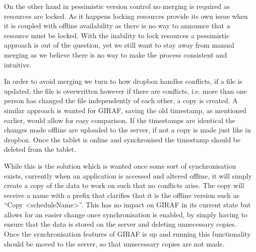 \bigskip
On the other hand in pessimistic version control no merging is required as resources are locked.
As it happens locking resources provide its own issue when it is coupled with offline availability as there is no way to announce that a resource must be locked.
With the inability to lock resources a pessimistic approach is out of the question, yet we still want to stay away from manual merging as we believe there is no way to make the process consistent and intuitive.

In order to avoid merging we turn to how dropbox handles conflicts, if a file is updated, the file is overwritten however if there are conflicts, i.e. more than one person has changed the file independently of each other, a copy is created.
A similar approach is wanted for GIRAF, saving the old timestamp, as mentioned earlier, would allow for easy comparison.
If the timestamps are identical the changes made offline are uploaded to the server, if not a copy is made just like in dropbox.
Once the tablet is online and synchronised the timestamp should be deleted from the tablet. 

\bigskip
While this is the solution which is wanted once some sort of synchronisation exists, currently when an application is accessed and altered offline, it will simply create a copy of the data to work on such that no conflicts arise. 
The copy will receive a name with a prefix that clarifies that it is the offline version such as \enquote{Copy <scheduleName>}.
This has no impact on GIRAF in its current state but allows for an easier change once synchronisation is enabled, by simply having to ensure that the data is stored on the server and deleting unnecessary copies.
Once the synchronisation features of GIRAF is up and running this functionality should be moved to the server, so that unnecessary copies are not made.
